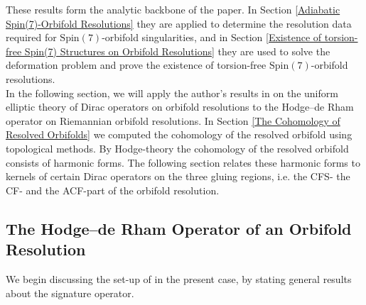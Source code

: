 \documentclass[psamsfonts]{amsart}
\theoremstyle{plain}
\theoremstyle{definition}{
\newtheorem{defi}{Definition}[section]
\newtheorem{ass}{Assumption}
\newtheorem*{nota}{Notation}}
\theoremstyle{remark}{
\newtheorem{rem}{Remark}
\newtheorem{ex}{Example}}
\theoremstyle{plain}{
\newtheorem{thm}{Theorem}[section]
\newtheorem{lem}{Lemma}[section]
\newtheorem{cor}{Corollary}[section]
\newtheorem{prop}{Proposition}[section]
\newtheorem{con}{Conjecture}[section]}
\newcommand{\m}[1]{{\mathrm{#1}}}
\begin{document}
These results form the analytic backbone of the paper. In Section \ref{Adiabatic Spin(7)-Orbifold Resolutions} they are applied to determine the resolution data required for $\m{Spin}(7)$-orbifold singularities, and in Section \ref{Existence of torsion-free Spin(7) Structures on Orbifold Resolutions} they are used to solve the deformation problem and prove the existence of torsion-free $\m{Spin}(7)$-orbifold resolutions.\\


In the following section, we will apply the author's results in \cite{majewskiDirac} on the uniform elliptic theory of Dirac operators on orbifold resolutions to the Hodge--de Rham operator on Riemannian orbifold resolutions. In Section \ref{The Cohomology of Resolved Orbifolds} we computed the cohomology of the resolved orbifold using topological methods. By Hodge-theory the cohomology of the resolved orbifold consists of harmonic forms. The following section relates these harmonic forms to kernels of certain Dirac operators on the three gluing regions, i.e. the CFS- the CF- and the ACF-part of the orbifold resolution.


\subsection{The Hodge--de Rham Operator of an Orbifold Resolution}
\label{The Hodge--de Rham Operator of an Orbifold Resolution}

We begin discussing the set-up of \cite{majewskiDirac} in the present case, by stating general results about the signature operator.\\
\end{document}
